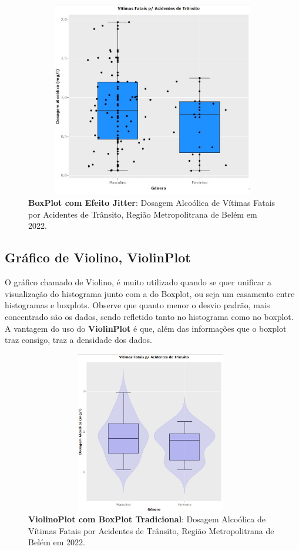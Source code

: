 \vspace{-2cm}
\begin{figure}[H]
    \centering
\includegraphics[scale=0.26,height=242pt,width=12cm]{figures/boxplot_dosagem_jitter.jpeg}
    \caption{\textbf{BoxPlot com Efeito Jitter}: Dosagem Alcoólica de Vítimas Fatais por Acidentes de Trânsito, Região Metropolitrana de Belém em 2022.}
    \label{fig:my_label25}
\end{figure}







\subsection{Gráfico de Violino, ViolinPlot}

O gráfico chamado de Violino, é muito utilizado quando se quer unificar a visualização do histograma junto com a do Boxplot, ou seja um casamento entre histogramas e boxplots. Observe que quanto menor o desvio padrão, mais concentrado são os dados, sendo refletido tanto no histograma como no boxplot. A vantagem do uso do \textbf{ViolinPlot} é que, além  das informações que o boxplot traz consigo, traz a densidade dos dados. 



\vspace{-2cm}
\begin{figure}[H]
    \centering
\includegraphics[scale=0.21,height=200pt,width=11cm]{figures/violinplot_Tradicional.jpeg}
    \caption{\textbf{ViolinoPlot com BoxPlot Tradicional}: Dosagem Alcoólica de Vítimas Fatais por Acidentes de Trânsito, Região Metropolitrana de Belém em 2022.}
    \label{fig:my_label25}
\end{figure}



